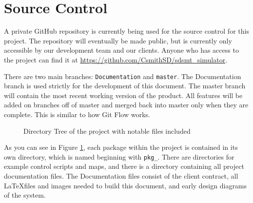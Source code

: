 \section{Source  Control}
A private GitHub repository is currently being used for the source control for this project. The repository will eventually be made public, but is currently only accessible by our development team and our clients. Anyone who has access to the project can find it at \url{https://github.com/CsmithSD/sdsmt_simulator}.

There are two main branches: \lstinline|Documentation| and \lstinline|master|. The Documentation branch is used strictly for the development of this document. The master branch will contain the most recent working version of the product. All features will be added on branches off of master and merged back into master only when they are complete. This is similar to how Git Flow works.

\begin{figure}
\centering
\begin{subfigure}{0.3\textwidth}
\end{subfigure}
\caption{Directory Tree of the project with notable files included}
\label{fig:dirtree}
\end{figure}

As you can see in Figure \ref{fig:dirtree}, each package within the project is contained in its own directory, which is named beginning with \lstinline|pkg_|. There are directories for example control scripts and maps, and there is a directory containing all project documentation files. The Documentation files consist of the client contract, all \LaTeX files and images needed to build this document, and early design diagrams of the system.

